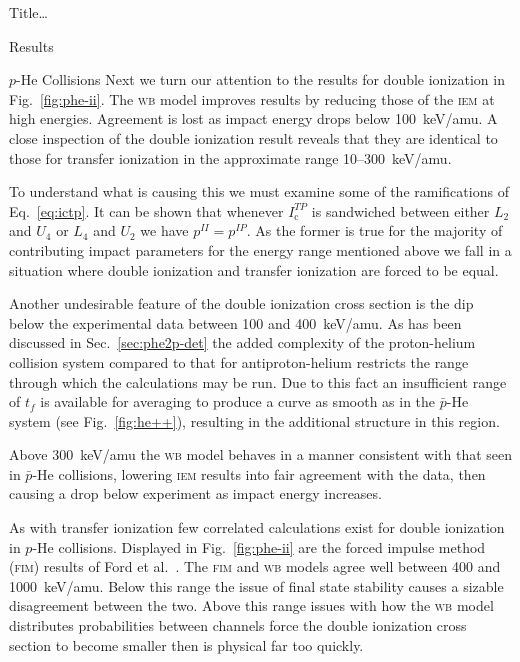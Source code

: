 \documentclass[letterpaper, 10 pt]{report}
\begin{document}
\begin{chapter}{ Title\dots \label{chap:p-he2p-he}}
\begin{section}{Results \label{sec:phe2p-res}}
\begin{subsection}{\texorpdfstring{$p$}{p}-He Collisions \label{sec:phe-res}}
         Next we turn our attention to the results for double ionization in Fig.~\ref{fig:phe-ii}. The
         \textsc{wb} model improves results by reducing those of the \textsc{iem} at high energies.
         Agreement is lost as impact energy drops below 100~keV/amu. A close inspection of the double
         ionization result reveals that they are identical to those for transfer ionization in the
         approximate range 10--300~keV/amu.
 
         To understand what is causing this we must examine some of the ramifications of
         Eq.~\eqref{eq:ictp}. It can be shown that whenever $I^{TP}_\mathrm{c}$ is sandwiched between
         either $L_2$ and $U_4$ or $L_4$ and $U_2$ we have $p^{II} = p^{IP}$. As the former is true for
         the majority of contributing impact parameters for the energy range mentioned above we fall in
         a situation where double ionization and transfer ionization are forced to be equal.

         Another undesirable feature of the double ionization cross section is the dip below the
         experimental data between 100 and 400~keV/amu. As has been discussed in
         Sec.~\ref{sec:phe2p-det} the added complexity of the proton-helium collision system compared to
         that for antiproton-helium restricts the range through which the calculations may be run. Due
         to this fact an insufficient range of $t_f$ is available for averaging to produce a curve as
         smooth as in the $\bar{p}$-He system (see Fig.~\ref{fig:he++}), resulting in the additional
         structure in this region.
        
         Above 300~keV/amu the \textsc{wb} model behaves in a manner consistent with that seen in
         $\bar{p}$-He collisions, lowering \textsc{iem} results into fair agreement with the data, then
         causing a drop below experiment as impact energy increases.
 
         As with transfer ionization few correlated calculations exist for double ionization in $p$-He
         collisions. Displayed in Fig.~\ref{fig:phe-ii} are the forced impulse method (\textsc{fim})
         results of Ford et al.~\cite{FR-94}. The \textsc{fim} and \textsc{wb} models agree well between
         400 and 1000~keV/amu. Below this range the issue of final state stability causes a sizable
         disagreement between the two. Above this range issues with how the \textsc{wb} model
         distributes probabilities between channels force  the double ionization cross section to become
         smaller then is physical far too quickly.


\end{subsection}
\end{section}
\end{chapter}
\end{document}
